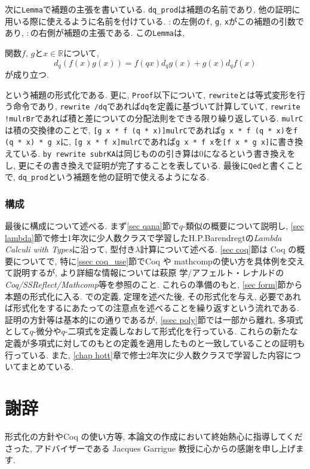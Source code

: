 \documentclass[11pt]{jsreport}
\theoremstyle{mystyle}
\newcommand{\R}{\mathbb{R}}
\newcommand{\0}{\textbf{0}}
\begin{document}
次に{\tt Lemma}で補題の主張を書いている. {\tt dq\_prod}は補題の名前であり, 他の証明に用いる際に使えるように名前を付けている. {\tt $\colon$}の左側の{\tt f}, {\tt g}, {\tt x}がこの補題の引数であり, {\tt $\colon$}の右側が補題の主張である. この{\tt Lemma}は, 
\begin{screen}
関数$f$, $g$と$x \in \R$について, 
\[
  d_q (f(x)g(x)) = f(qx)d_qg(x) + g(x)d_qf(x)
\]
が成り立つ.
\end{screen}
という補題の形式化である. 
更に, {\tt Proof}以下について, {\tt rewrite}とは等式変形を行う命令であり, {\tt rewrite /dq}であれば{\tt dq}を定義に基づいて計算していて, {\tt rewrite !mulrBr}であれば積と差についての分配法則をできる限り繰り返している. {\tt mulrC}は積の交換律のことで, 
{\tt [g x * f (q * x)]mulrC}であれば{\tt g x * f (q * x)}を{\tt f (q * x) * g x}に, 
{\tt [g x * f  x]mulrC}であれば{\tt g x * f x}を{\tt [f x * g x]}に書き換えている. 
{\tt by rewrite subrKA}は同じものの引き算は$0$になるという書き換えをし, 更にその書き換えで証明が完了することを表している. 
最後に{\tt Qed}と書くことで, {\tt dq\_prod}という補題を他の証明で使えるようになる. 
\subsubsection*{構成}
最後に構成について述べる. 
まず\ref{sec qana}節で$q$-類似の概要について説明し, 
\ref{sec lambda}節で修士1年次に少人数クラスで学習したH.P.Barendregtの{\it Lambda Calculi with Types}\cite{Bar}に沿って, 型付き$\lambda$計算について述べる. 
\ref{sec coq}節は Coq の概要についてで, 特に\ref{ssec coq_use}節でCoq や mathcompの使い方を具体例を交えて説明するが, より詳細な情報については萩原 学/アフェルト・レナルドの{\it Coq/SSReflect/Mathcomp}\cite{Hag}等を参照のこと. 
これらの準備のもと, \ref{sec form}節から本題の形式化に入る. \cite{Kac}での定義, 定理を述べた後, その形式化を与え, 必要であれば形式化をするにあたっての注意点を述べることを繰り返すという流れである. 
証明の方針等は基本的に\cite{Kac}の通りであるが, \ref{ssec poly}節では一部\cite{Kac}から離れ, 多項式として$q$-微分や$q$-二項式を定義しなおして形式化を行っている. これらの新たな定義が多項式に対してのもとの定義を適用したものと一致していることの証明も行っている. また, \ref{chap hott}章で修士2年次に少人数クラスで学習した内容についてまとめている. 
\section*{謝辞}
形式化の方針やCoq の使い方等, 本論文の作成において終始熱心に指導してくださった, アドバイザーである Jacques Garrigue 教授に心からの感謝を申し上げます. 
\end{document}
